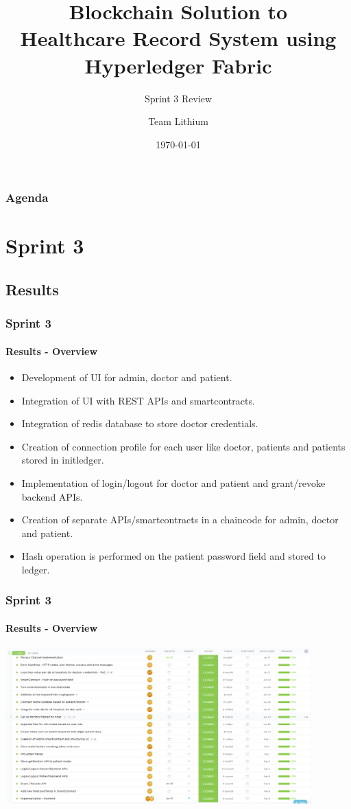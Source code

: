 \documentclass[english,hangout]{beamer}
\title{Blockchain Solution to\\Healthcare Record System using\\Hyperledger Fabric}
\subtitle{Sprint 3 Review}
\author{Team Lithium}
\date{\today}%
\begin{document}
\begin{frame}
\titlepage
\end{frame}



\begin{frame}
   \frametitle{Agenda}
   \tableofcontents%
\end{frame}




\section{Sprint 3}

\subsection{Results}

\begin{frame}[fragile]
 \frametitle{Sprint 3}
 \framesubtitle{Results - Overview}
  \begin{itemize}
    \item Development of UI for admin, doctor and patient.
    \item Integration of UI with REST APIs and smartcontracts.
    \item Integration of redis database to store doctor credentials. 
    \item Creation of connection profile for each user like doctor, patients and patients stored in initledger.
    \item Implementation of login/logout for doctor and patient and grant/revoke backend APIs.
    \item Creation of separate APIs/smartcontracts in a chaincode for admin, doctor and patient.
    \item Hash operation is performed on the patient password field and stored to ledger.
  \end{itemize}
\end{frame}

\begin{frame}[fragile]
 \frametitle{Sprint 3}
 \framesubtitle{Results - Overview}
\begin{center}
        \vspace{-1.2em}
            \includegraphics[height=6cm]{Sprint3Result.png}
        \end{center}
\end{frame}
\end{document}
